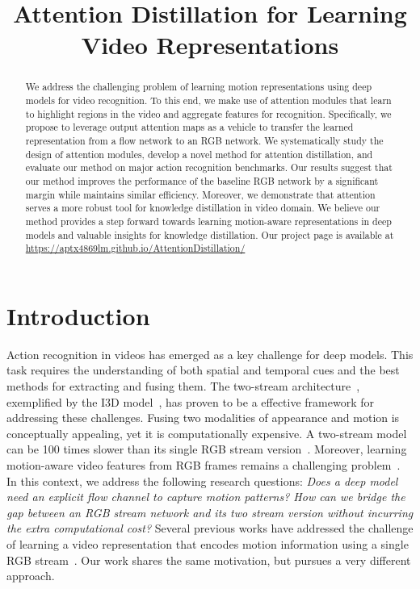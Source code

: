 \documentclass{bmvc2k}
\title{Attention Distillation for Learning Video Representations}
\begin{document}
\maketitle

\begin{abstract}
We address the challenging problem of learning motion representations using deep models for video recognition. To this end, we make use of attention modules that learn to highlight regions in the video and aggregate features for recognition. Specifically, we propose to leverage output attention maps as a vehicle to transfer the learned representation from a flow network to an RGB network. We systematically study the design of attention modules, develop a novel method for attention distillation, and evaluate our method on major action recognition benchmarks. Our results suggest that our method improves the performance of the baseline RGB network by a significant margin while maintains similar efficiency. Moreover, we demonstrate that attention serves a more robust tool for knowledge distillation in video domain. We believe our method provides a step forward towards learning motion-aware representations in deep models and valuable insights for knowledge distillation. Our project page is available at \url{https://aptx4869lm.github.io/AttentionDistillation/}
\end{abstract}
\section{Introduction}
Action recognition in videos has emerged as a key challenge for deep models. This task requires the understanding of both spatial and temporal cues and the best methods for extracting and fusing them. The two-stream architecture~\cite{simonyan2014two}, exemplified by the I3D model~\cite{carreira2017quo}, has proven to be a effective framework for addressing these challenges. Fusing two modalities of appearance and motion is conceptually appealing, yet it is computationally expensive. A two-stream model can be 100 times slower than its single RGB stream version~\cite{crasto2019mars}. Moreover, learning motion-aware video features from RGB frames remains a challenging problem~\cite{Feichtenhofer_2018_CVPR}. In this context, we address the following research questions: {\it Does a deep model need an explicit flow channel to capture motion patterns? How can we bridge the gap between an RGB stream network and its two stream version without incurring the extra computational cost?} Several previous works have addressed the challenge of learning a video representation that encodes motion information using a single RGB stream~\cite{Tran_2018_CVPR,stroud2020d3d,crasto2019mars,sun2018optical,jiang2019stm}. Our work shares the same motivation, but  pursues a very different approach.
\end{document}
